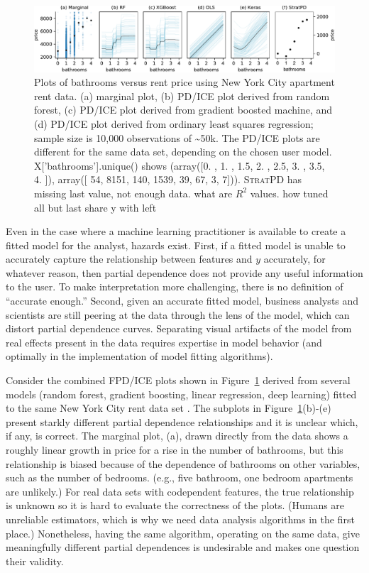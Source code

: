\documentclass{article}
\newcommand{\figref}[1]{Figure~\ref{#1}}
\newcommand{\spd}{\fontfamily{cmr}\textsc{\small StratPD}}
\begin{document}
\begin{figure}
\begin{center}
\includegraphics[scale=0.61]{images/bathrooms_vs_price.pdf}
\caption{\small Plots of bathrooms versus rent price using New York City apartment rent data. (a) marginal plot, (b) PD/ICE plot derived from random forest, (c) PD/ICE plot derived from gradient boosted machine, and (d) PD/ICE plot derived from ordinary least squares regression; sample size is 10,000 observations of \textasciitilde50k. The PD/ICE plots are  different for the same data set, depending on the chosen user model. X['bathrooms'].unique() shows (array([0. , 1. , 1.5, 2. , 2.5, 3. , 3.5, 4. ]),
 array([  54, 8151,  140, 1539,   39,   67,    3,    7])). \spd{} has missing last value, not enough data. what are $R^2$ values. how tuned all but last share y with left \vspace{-7mm}}
\label{fig:baths_price}
\end{center}
\end{figure}

Even in the case where a machine learning practitioner is available to create a fitted model for the analyst, hazards exist. First, if a fitted model is unable to accurately capture the relationship between features and $y$ accurately, for whatever reason, then partial dependence does not provide any useful information to the user.  To make interpretation more challenging, there is no definition of ``accurate enough.'' Second, given an accurate fitted model, business analysts and scientists are still peering at the data through the lens of the model, which can distort partial dependence curves. Separating visual artifacts of the model from real effects present in the data requires expertise in model behavior (and optimally in the implementation of model fitting algorithms). 

Consider the combined FPD/ICE plots shown in \figref{fig:baths_price} derived from several models (random forest, gradient boosting, linear regression, deep learning) fitted to the same New York City rent data set \citet{rent}.  The subplots in \figref{fig:baths_price}(b)-(e)  present starkly different partial dependence relationships and it is unclear which, if any, is correct.  The marginal plot, (a), drawn directly from the data shows a roughly linear growth in price for a rise in the number of bathrooms, but this relationship is biased because of the dependence of bathrooms on other variables, such as the number of bedrooms. (e.g., five bathroom, one bedroom apartments are unlikely.)  For real data sets with codependent features, the true relationship is unknown so it is hard to evaluate the correctness of the plots. (Humans are unreliable estimators, which is why we need data analysis algorithms in the first place.) Nonetheless, having the same algorithm, operating on the same data, give meaningfully different partial dependences is undesirable and makes one question their validity.
\end{document}

